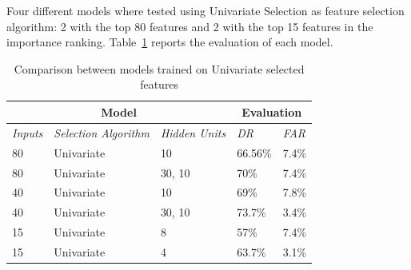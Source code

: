 Four different models where tested using Univariate Selection as feature selection algorithm: 2 with the top 80 features and 2 with the top 15 features in the importance ranking. Table~\ref{tab:univfeat} reports the evaluation of each model.

\begin{table}[h]
\center
\begin{tabular}{|l|l|l||l|l|}
\hline
\multicolumn{3}{|c||}{\textbf{Model}}                                   & \multicolumn{2}{c|}{\textbf{Evaluation}} \\ \hline
\textit{Inputs} & \textit{Selection Algorithm} & \textit{Hidden Units} & \textit{DR}    & \textit{FAR}    \\ \hline
80             & Univariate                         & 10                    &   66.56\%                  &   7.4\%                 \\ \hline
80             & Univariate                         & 30, 10               &     70\%                &   7.4\%                 \\ \hline
40             & Univariate                         & 10                    &    69\%                 &   7.8\%                 \\ \hline
40             & Univariate                         & 30, 10               &   73.7\%                  &    3.4\%                \\ \hline
15             & Univariate                         & 8                &    57\%                 &      7.4\%              \\ \hline
15             & Univariate                         & 4                &    63.7\%                 &          3.1\%          \\ \hline
\end{tabular}
\caption{Comparison between models trained on Univariate selected features}
\label{tab:univfeat}
\end{table}


